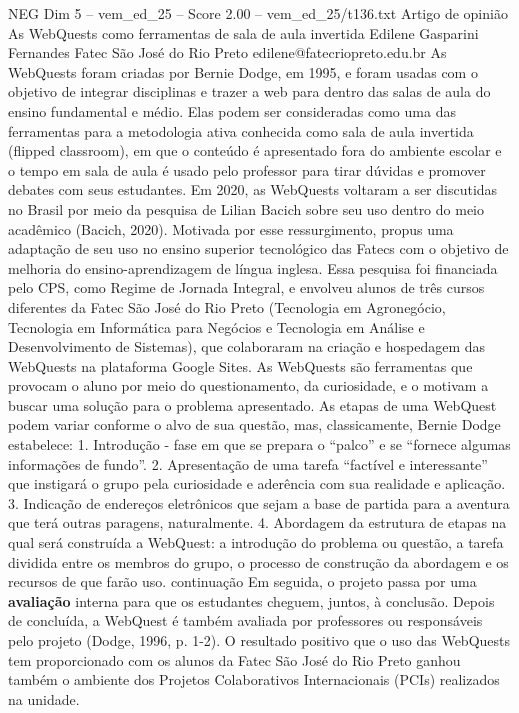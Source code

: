 \begin{textsample}{NEG Dim 5 – vem\_ed\_25 – Score 2.00 – vem\_ed\_25/t136.txt}  \label{ex:f5_neg_156}
Artigo de opinião As WebQuests como ferramentas de sala de aula invertida Edilene Gasparini Fernandes Fatec São José do Rio Preto edilene@fatecriopreto.edu.br As WebQuests foram criadas por Bernie Dodge, em 1995, e foram usadas com o objetivo de integrar disciplinas e trazer a web para dentro das salas de aula do ensino fundamental e médio.
Elas podem ser consideradas como uma das ferramentas para a metodologia ativa conhecida como sala de aula invertida (flipped classroom), em que o conteúdo é apresentado fora do ambiente escolar e o tempo em sala de aula é usado pelo professor para tirar dúvidas e promover debates com seus estudantes.
Em 2020, as WebQuests voltaram a ser discutidas no Brasil por meio da pesquisa de Lilian Bacich sobre seu uso dentro do meio acadêmico (Bacich, 2020).
Motivada por esse ressurgimento, propus uma adaptação de seu uso no ensino superior tecnológico das Fatecs com o objetivo de melhoria do ensino-aprendizagem de língua inglesa.
Essa pesquisa foi financiada pelo CPS, como Regime de Jornada Integral, e envolveu alunos de três cursos diferentes da Fatec São José do Rio Preto (Tecnologia em Agronegócio, Tecnologia em Informática para Negócios e Tecnologia em Análise e Desenvolvimento de Sistemas), que colaboraram na criação e hospedagem das WebQuests na plataforma Google Sites.
As WebQuests são ferramentas que provocam o aluno por meio do questionamento, da curiosidade, e o motivam a buscar uma solução para o problema apresentado.
As etapas de uma WebQuest podem variar conforme o alvo de sua questão, mas, classicamente, Bernie Dodge estabelece: 1.
Introdução - fase em que se prepara o “palco” e se “fornece algumas informações de fundo”. 2.
Apresentação de uma tarefa “factível e interessante” que instigará o grupo pela curiosidade e aderência com sua realidade e aplicação. 3.
Indicação de endereços eletrônicos que sejam a base de partida para a aventura que terá outras paragens, naturalmente. 4.
Abordagem da estrutura de etapas na qual será construída a WebQuest: a introdução do problema ou questão, a tarefa dividida entre os membros do grupo, o processo de construção da abordagem e os recursos de que farão uso. continuação Em seguida, o projeto passa por uma \textbf{avaliação} interna para que os estudantes cheguem, juntos, à conclusão.
Depois de concluída, a WebQuest é também avaliada por professores ou responsáveis pelo projeto (Dodge, 1996, p. 1-2).
O resultado positivo que o uso das WebQuests tem proporcionado com os alunos da Fatec São José do Rio Preto ganhou também o ambiente dos Projetos Colaborativos Internacionais (PCIs) realizados na unidade.

\end{textsample}
